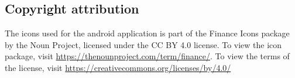 \documentclass[11pt, a4paper]{article}
\begin{document}
\begin{appendices}

\section{Copyright attribution}
The icons used for the android application is part of the Finance Icons package by the Noun Project, licensed under the CC BY 4.0 license. To view the icon package, visit \url{https://thenounproject.com/term/finance/}. To view the terms of the license, visit \url{https://creativecommons.org/licenses/by/4.0/}
\end{appendices}
\end{document}
